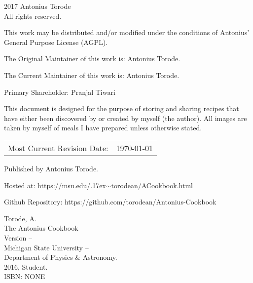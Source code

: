 \pagestyle{empty}
\AddToShipoutPicture*{\TowerGarden}
\begingroup
\footnotesize
\parindent 0pt
\parskip \baselineskip
\textcopyright{} 2017 Antonius Torode \\
All rights reserved.

This work may be distributed and/or modified under the conditions of Antonius’ General Purpose License (AGPL).

The Original Maintainer of this work is: Antonius Torode.

The Current Maintainer of this work is: Antonius Torode.

Primary Shareholder: Pranjal Tiwari

This document is designed for the purpose of storing and sharing recipes that have either been discovered by or created by myself (the author). All images are taken by myself of meals I have prepared unless otherwise stated.

\begin{center}
\begin{tabular}{ll}
Most Current Revision Date: &  \today 
\end{tabular}
\end{center}

Published by Antonius Torode. 

Hosted at: https://msu.edu/{\raise.17ex\hbox{$\scriptstyle\sim$}}torodean/ACookbook.html

Github Repository: https://github.com/torodean/Antonius-Cookbook

\vfill


Torode, A.\\
\hspace*{2em} The Antonius Cookbook \\
\hspace*{2em} Version -- \Version \\
\hspace*{2em} Michigan State University -- \\
\hspace*{2em} Department of Physics \& Astronomy. \\
\hspace*{2em} 2016, Student. \\
\hspace*{2em} ISBN: NONE \\



\endgroup
\clearpage